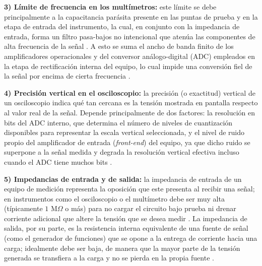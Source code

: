 \documentclass[journal, a4paper]{IEEEtran}
\begin{document}
\textbf{3) Límite de frecuencia en los multímetros:} este límite se debe principalmente a la capacitancia parásita presente en las puntas de prueba y en la etapa de entrada del instrumento, la cual, en conjunto con la impedancia de entrada, forma un filtro pasa-bajos no intencional que atenúa las componentes de alta frecuencia de la señal \cite{allaboutcircuits_freqlimit}. A esto se suma el ancho de banda finito de los amplificadores operacionales y del conversor análogo-digital (ADC) empleados en la etapa de rectificación interna del equipo, lo cual impide una conversión fiel de la señal por encima de cierta frecuencia \cite{allaboutcircuits_freqlimit}.

\textbf{4) Precisión vertical en el osciloscopio:} la precisión (o exactitud) vertical de un osciloscopio indica qué tan cercana es la tensión mostrada en pantalla respecto al valor real de la señal. Depende principalmente de dos factores: la resolución en bits del ADC interno, que determina el número de niveles de cuantización disponibles para representar la escala vertical seleccionada, y el nivel de ruido propio del amplificador de entrada (\emph{front-end}) del equipo, ya que dicho ruido se superpone a la señal medida y degrada la resolución vertical efectiva incluso cuando el ADC tiene muchos bits \cite{keysight_vertacc}.

\textbf{5) Impedancias de entrada y de salida:} la impedancia de entrada de un equipo de medición representa la oposición que este presenta al recibir una señal; en instrumentos como el osciloscopio o el multímetro debe ser muy alta (típicamente $1\text{ M}\Omega$ o más) para no cargar el circuito bajo prueba ni drenar corriente adicional que altere la tensión que se desea medir \cite{buadlab_impedance}. La impedancia de salida, por su parte, es la resistencia interna equivalente de una fuente de señal (como el generador de funciones) que se opone a la entrega de corriente hacia una carga; idealmente debe ser baja, de manera que la mayor parte de la tensión generada se transfiera a la carga y no se pierda en la propia fuente \cite{buadlab_impedance}.
\end{document}
